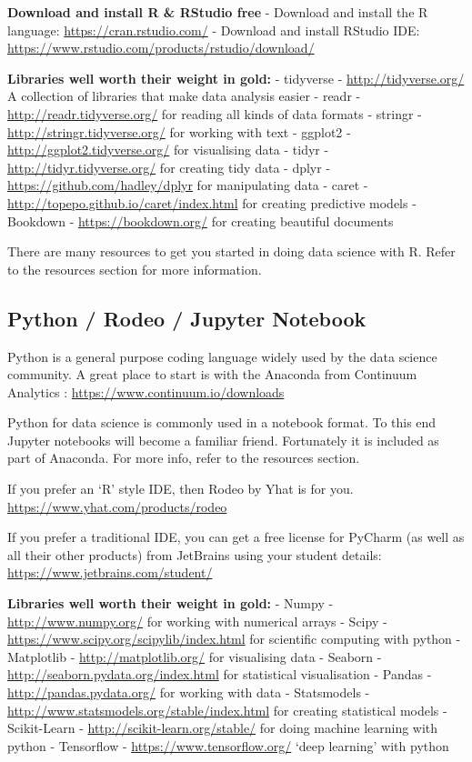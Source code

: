 \documentclass[]{book}
\theoremstyle{definition}
\theoremstyle{definition}
\theoremstyle{remark}
\begin{document}
\textbf{Download and install R \& RStudio free} - Download and install
the R language: \url{https://cran.rstudio.com/} - Download and install
RStudio IDE: \url{https://www.rstudio.com/products/rstudio/download/}

\textbf{Libraries well worth their weight in gold:} - tidyverse -
\url{http://tidyverse.org/} A collection of libraries that make data
analysis easier - readr - \url{http://readr.tidyverse.org/} for reading
all kinds of data formats - stringr -
\url{http://stringr.tidyverse.org/} for working with text - ggplot2 -
\url{http://ggplot2.tidyverse.org/} for visualising data - tidyr -
\url{http://tidyr.tidyverse.org/} for creating tidy data - dplyr -
\url{https://github.com/hadley/dplyr} for manipulating data - caret -
\url{http://topepo.github.io/caret/index.html} for creating predictive
models - Bookdown - \url{https://bookdown.org/} for creating beautiful
documents

There are many resources to get you started in doing data science with
R. Refer to the resources section for more information.

\subsection{Python / Rodeo / Jupyter
Notebook}\label{python-rodeo-jupyter-notebook}

Python is a general purpose coding language widely used by the data
science community. A great place to start is with the Anaconda from
Continuum Analytics : \url{https://www.continuum.io/downloads}

Python for data science is commonly used in a notebook format. To this
end Jupyter notebooks will become a familiar friend. Fortunately it is
included as part of Anaconda. For more info, refer to the resources
section.

If you prefer an `R' style IDE, then Rodeo by Yhat is for you.
\url{https://www.yhat.com/products/rodeo}

If you prefer a traditional IDE, you can get a free license for PyCharm
(as well as all their other products) from JetBrains using your student
details: \url{https://www.jetbrains.com/student/}

\textbf{Libraries well worth their weight in gold:} - Numpy -
\url{http://www.numpy.org/} for working with numerical arrays - Scipy -
\url{https://www.scipy.org/scipylib/index.html} for scientific computing
with python - Matplotlib - \url{http://matplotlib.org/} for visualising
data - Seaborn - \url{http://seaborn.pydata.org/index.html} for
statistical visualisation - Pandas - \url{http://pandas.pydata.org/} for
working with data - Statsmodels -
\url{http://www.statsmodels.org/stable/index.html} for creating
statistical models - Scikit-Learn -
\url{http://scikit-learn.org/stable/} for doing machine learning with
python - Tensorflow - \url{https://www.tensorflow.org/} `deep learning'
with python
\end{document}
